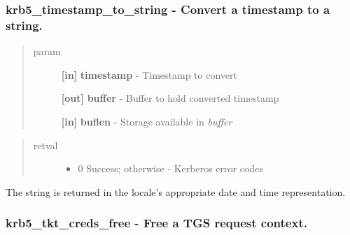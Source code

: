 \documentclass[letterpaper,10pt,english]{sphinxmanual}
\begin{document}
\subsubsection{krb5\_timestamp\_to\_string -  Convert a timestamp to a string.}
\label{appdev/refs/api/krb5_timestamp_to_string::doc}\label{appdev/refs/api/krb5_timestamp_to_string:krb5-timestamp-to-string-convert-a-timestamp-to-a-string}

\begin{fulllineitems}
\label{appdev/refs/api/krb5_timestamp_to_string:c.krb5_timestamp_to_string}
\end{fulllineitems}

\begin{quote}\begin{description}
\item[{param}] \leavevmode
\textbf{{[}in{]}} \textbf{timestamp} - Timestamp to convert

\textbf{{[}out{]}} \textbf{buffer} - Buffer to hold converted timestamp

\textbf{{[}in{]}} \textbf{buflen} - Storage available in \emph{buffer}

\end{description}\end{quote}
\begin{quote}\begin{description}
\item[{retval}] \leavevmode\begin{itemize}
\item {} 
0   Success; otherwise - Kerberos error codes

\end{itemize}

\end{description}\end{quote}

The string is returned in the locale's appropriate date and time representation.


\subsubsection{krb5\_tkt\_creds\_free -  Free a TGS request context.}
\label{appdev/refs/api/krb5_tkt_creds_free::doc}\label{appdev/refs/api/krb5_tkt_creds_free:krb5-tkt-creds-free-free-a-tgs-request-context}
\end{document}
